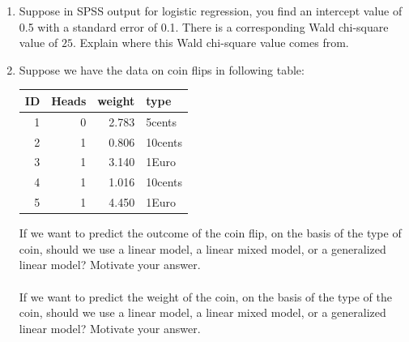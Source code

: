 \documentclass[]{book}\usepackage[]{graphicx}\usepackage[]{color}
\newenvironment{knitrout}{}{} %
\begin{document}
\begin{enumerate}
\item
Suppose in SPSS output for logistic regression, you find an intercept value of 0.5 with a standard error of 0.1. There is a corresponding Wald chi-square value of $25$. Explain where this Wald chi-square value comes from.

\item

Suppose we have the data on coin flips in following table:

\begin{knitrout}
\color{fgcolor}
\begin{tabular}{r|r|r|l}
\hline
ID & Heads & weight & type\\
\hline
1 & 0 & 2.783 & 5cents\\
\hline
2 & 1 & 0.806 & 10cents\\
\hline
3 & 1 & 3.140 & 1Euro\\
\hline
4 & 1 & 1.016 & 10cents\\
\hline
5 & 1 & 4.450 & 1Euro\\
\hline
\end{tabular}


\end{knitrout}

If we want to predict the outcome of the coin flip, on the basis of the type of coin, should we use a linear model, a linear mixed model, or a generalized linear model? Motivate your answer.
\\
\\
If we want to predict the weight of the coin, on the basis of the type of the coin, should we use a linear model, a linear mixed model, or a generalized linear model? Motivate your answer.


\end{enumerate}
\end{document}
